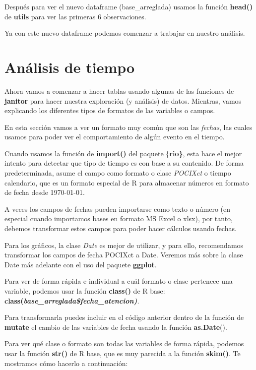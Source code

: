 \documentclass[
  letterpaper,
  DIV=11,
  numbers=noendperiod]{scrreprt}
\begin{document}
Después para ver el nuevo dataframe (base\_arreglada) usamos la función
\textbf{head()} de \textbf{utils} para ver las primeras 6 observaciones.

Ya con este nuevo dataframe podemos comenzar a trabajar en nuestro
análisis.

\section{Análisis de tiempo}\label{anuxe1lisis-de-tiempo}

Ahora vamos a comenzar a hacer tablas usando algunas de las funciones de
\textbf{janitor} para hacer nuestra exploración (y análisis) de datos.
Mientras, vamos explicando los diferentes tipos de formatos de las
variables o campos.

En esta sección vamos a ver un formato muy común que son las
\emph{fechas}, las cuales usamos para poder ver el comportamiento de
algún evento en el tiempo.

Cuando usamos la función de \textbf{import()} del paquete
\{\textbf{rio\}}, esta hace el mejor intento para detectar que tipo de
tiempo es con base a su contenido. De forma predeterminada, asume el
campo como formato o clase \emph{POCIXct} o tiempo calendario, que es un
formato especial de R para almacenar números en formato de fecha desde
1970-01-01.

A veces los campos de fechas pueden importarse como texto o número (en
especial cuando importamos bases en formato MS Excel o xlsx), por tanto,
debemos transformar estos campos para poder hacer cálculos usando
fechas.

Para los gráficos, la clase \emph{Date} es mejor de utilizar, y para
ello, recomendamos transformar los campos de fecha POCIXct a Date.
Veremos más sobre la clase Date más adelante con el uso del paquete
\textbf{ggplot}.

Para ver de forma rápida e individual a cuál formato o clase pertenece
una variable, podemos usar la función \textbf{class()} de R base:
\textbf{class(\emph{base\_arreglada\$fecha\_atencion)}}\emph{.}

Para transformarla puedes incluir en el código anterior dentro de la
función de \textbf{mutate} el cambio de las variables de fecha usando la
función \textbf{as.Date}().

Para ver qué clase o formato son todas las variables de forma rápida,
podemos usar la función \textbf{str()} de R base, que es muy parecida a
la función \textbf{skim()}. Te mostramos cómo hacerlo a continuación:
\end{document}
